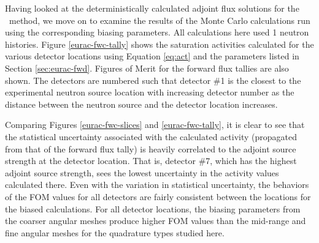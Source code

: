 Having looked at the deterministically calculated adjoint flux solutions for the \fwc\ method,
we move on to examine the results of the Monte Carlo calculations run using the corresponding
biasing parameters. All calculations here used 1 neutron histories.
Figure \ref{eurac-fwc-tally} shows the saturation activities calculated for
the various detector locations using Equation \ref{eq:act} and the parameters listed in
Section \ref{sec:eurac-fwd}. Figures of Merit for the forward flux tallies are also shown. The
detectors are numbered such that detector \#1 is the closest to the experimental neutron source
location with increasing detector number as the distance between the neutron source and the
detector location increases.

Comparing Figures \ref{eurac-fwc-slices} and \ref{eurac-fwc-tally}, it is clear to see that the
statistical uncertainty associated with the calculated activity (propagated from that of the
forward flux tally) is heavily correlated to the adjoint source strength at the detector 
location. That is, detector \#7, which has the highest adjoint source strength, sees the lowest
uncertainty in the activity values calculated there. Even with the variation in statistical
uncertainty, the behaviors of the FOM values for all detectors are fairly consistent between the
locations for the biased calculations. For all detector locations, the biasing parameters from
the coarser angular meshes produce higher FOM values than the mid-range and fine angular meshes
for the quadrature types studied here.

